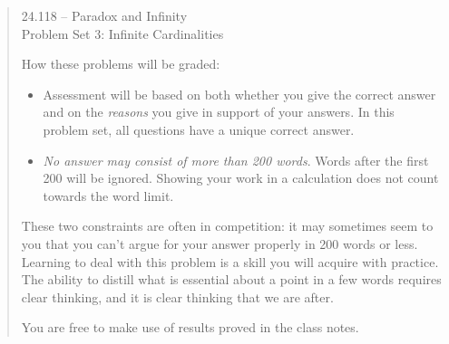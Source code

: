 \documentclass[12pt,a4paper]{article}
\begin{document}
\begin{quote}

\begin{center} {\large 24.118 -- Paradox and Infinity \\ \vspace{1mm}}
 {\large Problem Set 3: Infinite Cardinalities\\ \vspace{1mm}}
 
\end{center}
\vspace{3mm}

\noindent How these problems will be graded:

\begin{itemize} 

\item Assessment will be based on both whether you give the correct answer and on the \emph{reasons} you give in support of your answers. In this problem set, all questions have a unique correct answer.

\item  \emph{No answer may consist of more than 200 words}. Words after the first 200 will be ignored. Showing your work in a calculation does not count towards the word limit.

\end{itemize} 

These two constraints are often in competition: it may sometimes seem to you that you can't argue for your answer properly in 200 words or less. Learning to deal with this problem is a skill you will acquire with practice. The ability to distill what is essential about a point in a few words requires clear thinking, and it is clear thinking that we are after.

You are free to make use of results proved in the class notes.

\end{quote} 
\end{document}
